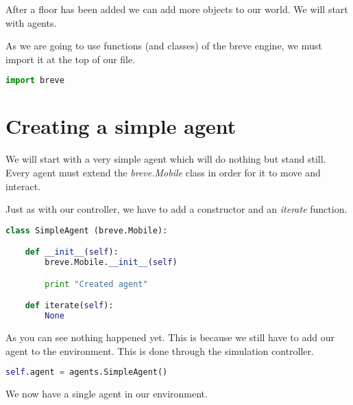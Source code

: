 After a floor has been added we can add more objects to our world. We will start with agents.


As we are going to use functions (and classes) of the breve engine, we must import it at the top of our file.

\begin{lstlisting}[language=Python]
import breve
\end{lstlisting}


\section{Creating a simple agent}

We will start with a very simple agent which will do nothing but stand still. Every agent must extend the \textit{breve.Mobile} class in order for it to move and interact.

Just as with our controller, we have to add a constructor and an \textit{iterate} function.

\begin{lstlisting}[language=Python]
class SimpleAgent (breve.Mobile):

	def __init__(self):
		breve.Mobile.__init__(self)

		print "Created agent"

	def iterate(self):
		None
\end{lstlisting}



As you can see nothing happened yet. This is because we still have to add our agent to the environment. This is done through the simulation controller.

\begin{lstlisting}[language=Python]
self.agent = agents.SimpleAgent()
\end{lstlisting}


We now have a single agent in our environment.